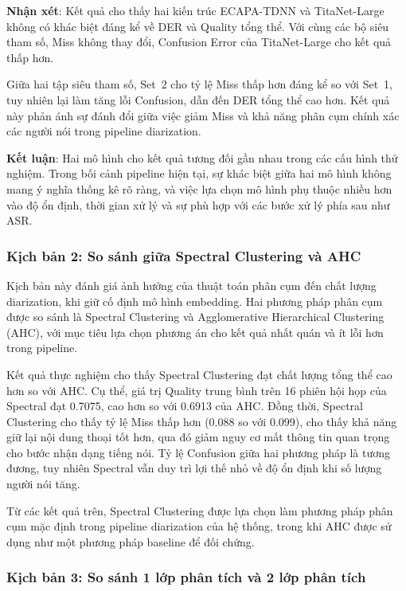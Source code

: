 \textbf{Nhận xét}: Kết quả cho thấy hai kiến trúc ECAPA-TDNN và TitaNet-Large không có khác biệt đáng kể về DER và Quality tổng thể. Với cùng các bộ siêu tham số, Miss không thay đổi, Confusion Error của TitaNet-Large cho kết quả thấp hơn. 

Giữa hai tập siêu tham số, Set~2 cho tỷ lệ Miss thấp hơn đáng kể so với Set~1, tuy nhiên lại làm tăng lỗi Confusion, dẫn đến DER tổng thể cao hơn. Kết quả này phản ánh sự đánh đổi giữa việc giảm Miss và khả năng phân cụm chính xác các người nói trong pipeline diarization.

\textbf{Kết luận}: Hai mô hình cho kết quả tương đối gần nhau trong các cấu hình thử nghiệm. Trong bối cảnh pipeline hiện tại, sự khác biệt giữa hai mô hình không mang ý nghĩa thống kê rõ ràng, và việc lựa chọn mô hình phụ thuộc nhiều hơn vào độ ổn định, thời gian xử lý và sự phù hợp với các bước xử lý phía sau như ASR.

\subsubsection{Kịch bản 2: So sánh giữa Spectral Clustering và AHC}
Kịch bản này đánh giá ảnh hưởng của thuật toán phân cụm đến chất lượng diarization, khi giữ cố định mô hình embedding. Hai phương pháp phân cụm được so sánh là Spectral Clustering và Agglomerative Hierarchical Clustering (AHC), với mục tiêu lựa chọn phương án cho kết quả nhất quán và ít lỗi hơn trong pipeline.

Kết quả thực nghiệm cho thấy Spectral Clustering đạt chất lượng tổng thể cao hơn so với AHC. Cụ thể, giá trị Quality trung bình trên 16 phiên hội họp của Spectral đạt 0.7075, cao hơn so với 0.6913 của AHC. Đồng thời, Spectral Clustering cho thấy tỷ lệ Miss thấp hơn (0.088 so với 0.099), cho thấy khả năng giữ lại nội dung thoại tốt hơn, qua đó giảm nguy cơ mất thông tin quan trọng cho bước nhận dạng tiếng nói. Tỷ lệ Confusion giữa hai phương pháp là tương đương, tuy nhiên Spectral vẫn duy trì lợi thế nhỏ về độ ổn định khi số lượng người nói tăng.

Từ các kết quả trên, Spectral Clustering được lựa chọn làm phương pháp phân cụm mặc định trong pipeline diarization của hệ thống, trong khi AHC được sử dụng như một phương pháp baseline để đối chứng.

\subsubsection{Kịch bản 3: So sánh 1 lớp phân tích và 2 lớp phân tích}


